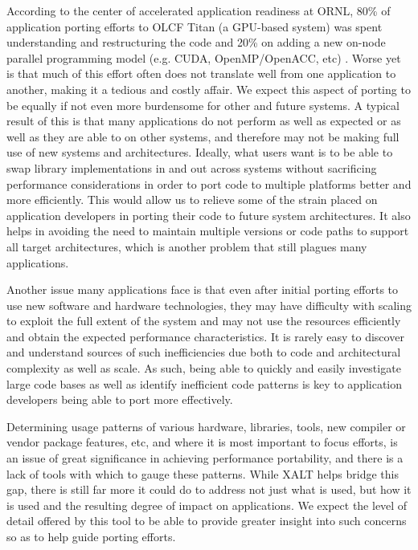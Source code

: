 According to the center of accelerated application readiness at \acs{ORNL}, 80\% of application porting efforts 
to OLCF Titan (a \acs{GPU}-based system) was spent understanding and restructuring the code and 20\% on 
adding a new on-node parallel programming model (e.g. CUDA, OpenMP/OpenACC, etc) \cite{titan}.
Worse yet is that much of this effort often does not translate well from one application to another, making it a 
tedious and costly affair.
We expect this aspect of porting to be equally if not even more burdensome for other and future systems.
A typical result of this is that many applications do not perform as well as expected or as well as they are able 
to on other systems, and therefore may not be making full use of new systems and architectures.
Ideally, what users want is to be able to swap library implementations in and out across systems without 
sacrificing performance considerations in order to port code to multiple platforms better and more efficiently.
This would allow us to relieve some of the strain placed on application developers in porting their code to 
future system architectures.
It also helps in avoiding the need to maintain multiple versions or code paths to support all target architectures, 
which is another problem that still plagues many applications.

Another issue many applications face is that even after initial porting efforts to use new software and hardware 
technologies, they may have difficulty with scaling to exploit the full extent of the system and may not use the 
resources efficiently and obtain the expected performance characteristics.
It is rarely easy to discover and understand sources of such inefficiencies due both to code and architectural 
complexity as well as scale.
As such, being able to quickly and easily investigate large code bases as well as identify inefficient code 
patterns is key to application developers being able to port more effectively.

Determining usage patterns of various hardware, libraries, tools, new compiler or vendor package features, 
etc, and where it is most important to focus efforts, is an issue of great significance in achieving performance 
portability, and there is a lack of tools with which to gauge these patterns.
While XALT helps bridge this gap, there is still far more it could do to address not just what is used, but how it 
is used and the resulting degree of impact on applications.
We expect the level of detail offered by this tool to be able to provide greater insight into such concerns so as 
to help guide porting efforts.

